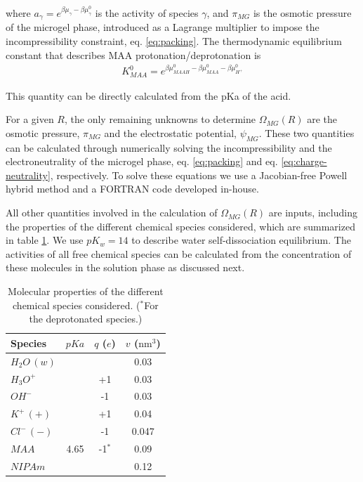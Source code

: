 \noindent where $a_\gamma = e^{\beta\mu_\gamma-\beta\mu_\gamma^0}$ is the activity of species $\gamma$, and $\pi_{MG}$ is the osmotic pressure of the microgel phase, introduced as a Lagrange multiplier to impose the incompressibility constraint, eq. \ref{eq:packing}.
The thermodynamic equilibrium constant that describes MAA protonation/deprotonation is
%
%
\begin{align}
K^0_{MAA}= e^{\beta\mu^0_{MAAH}-\beta\mu^0_{MAA}-\beta\mu^0_{H^+}}
\end{align}

\noindent This quantity can be directly calculated from the pKa of the acid.




For a given $R$, the only remaining unknowns to determine $\Omega_{MG}(R)$ are the osmotic pressure, $\pi_{MG}$ and the electrostatic potential, $\psi_{MG}$.
These two quantities can be calculated through numerically solving the incompressibility and the electroneutrality of the microgel phase, eq. \ref{eq:packing} and eq. \ref{eq:charge-neutrality}, respectively. 
To solve these equations we use a Jacobian-free Powell hybrid method and a FORTRAN code developed in-house.


All other quantities involved in the calculation of $\Omega_{MG}(R)$ are inputs, including the properties of the different chemical species considered, which are summarized in table \ref{table:molecules}.
We use $pK_w=14$ to describe water self-dissociation equilibrium.
The activities of all free chemical species can be calculated from the concentration of these molecules in the solution phase as discussed next.


\begin{table}
\begin{tabular}{|lccc|}
    \hline
    {Species} & {$pKa$} & {$q$ ($e$)} & {$v$ ($\text{nm}^3$)} \\
      \hline
$H_2O\,(w)$ & ~ & ~ & 0.03\\
$H_3O^+$ & ~ & +1 & 0.03\\
$OH^-$ & ~ & -1 & 0.03\\
$K^+\,(+)$ & ~ & +1 & 0.04\\ 
$Cl^-\,(-)$ & ~ & -1 & 0.047\\
$MAA$ & 4.65 & -1$^\ast$ & 0.09\\
$NIPAm$ & ~ & ~ & 0.12\\
    \hline
  \end{tabular}
 \caption{Molecular properties of the different chemical species considered.
 \footnotesize ($^\ast$For the deprotonated species.)}
\label{table:molecules} 
\end{table}


